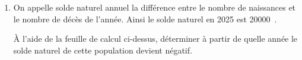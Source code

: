 \documentclass[10pt]{article}
\providecommand{\np}[2][]{{#2~#1}}
\begin{document}
\begin{enumerate}
	\begin{enumerate}
		\item Quelle formule doit-on saisir dans la cellule \textsf{C3} de sorte que, recopiée vers le bas, elle permette d'afficher les valeurs de la suite $(v_{n})$ ?
		\item Justifier, par un calcul, pourquoi \np{49000} est affiché dans la cellule \textsf{C12}.
	\end{enumerate}

	\item On appelle solde naturel annuel la différence entre le nombre de naissances et le nombre de décès de l'année. Ainsi le solde naturel en 2025 est \np{20000}.

	À l'aide de la feuille de calcul ci-dessus, déterminer à partir de quelle année le solde naturel de cette population devient négatif.
\end{enumerate}
\end{document}

